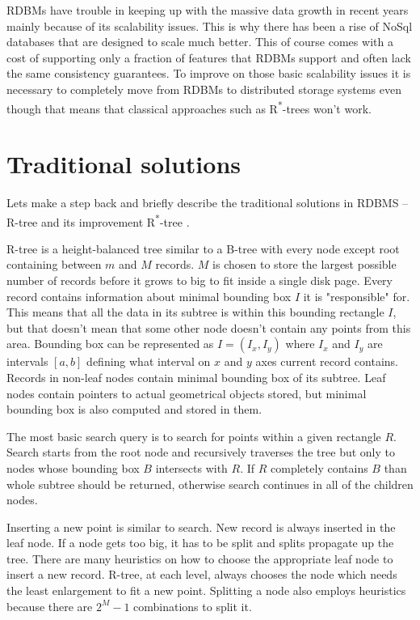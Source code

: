 \documentclass[times, utf8, diplomski]{fer}
\newcommand{\rstar}{R\textsuperscript{*}}
\begin{document}
RDBMs have trouble in keeping up with the massive data growth in recent years mainly because of its scalability issues. This is why there has been a rise of NoSql databases that are designed to scale much better. This of course comes with a cost of supporting only a fraction of features that RDBMs support and often lack the same consistency guarantees. To improve on those basic scalability issues it is necessary to completely move from RDBMs to distributed storage systems even though that means that classical approaches such as \rstar-trees won't work.

\section{Traditional solutions} \label{traditional}
Lets make a step back and briefly describe the traditional solutions in RDBMS -- R-tree \citet{rtree} and its improvement \rstar-tree \citet{rstar}.

R-tree is a height-balanced tree similar to a B-tree with every node except root containing between $m$ and $M$ records. $M$ is chosen to store the largest possible number of records before it grows to big to fit inside a single disk page. Every record contains information about minimal bounding box $I$ it is "responsible" for. This means that all the data in its subtree is within this bounding rectangle $I$, but that doesn't mean that some other node doesn't contain any points from this area. Bounding box can be represented as $I = (I_x, I_y)$ where $I_x$ and $I_y$ are intervals $[a, b]$ defining what interval on $x$ and $y$ axes current record contains. Records in non-leaf nodes contain minimal bounding box of its subtree. Leaf nodes contain pointers to actual geometrical objects stored, but minimal bounding box is also computed and stored in them.

The most basic search query is to search for points within a given rectangle $R$. Search starts from the root node and recursively traverses the tree but only to nodes whose bounding box $B$ intersects with $R$. If $R$ completely contains $B$ than whole subtree should be returned, otherwise search continues in all of the children nodes.

Inserting a new point is similar to search. New record is always inserted in the leaf node. If a node gets too big, it has to be split and splits propagate up the tree. There are many heuristics on how to choose the appropriate leaf node to insert a new record. R-tree, at each level, always chooses the node which needs the least enlargement to fit a new point. Splitting a node also employs heuristics because there are $2^M-1$ combinations to split it.
\end{document}
